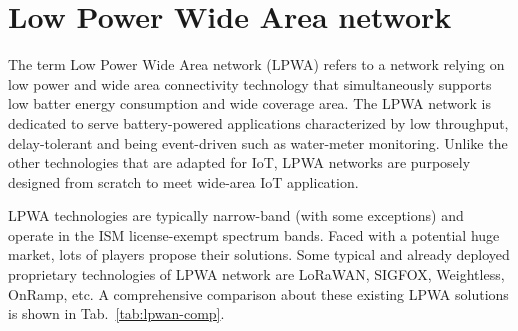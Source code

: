 \section{Low Power Wide Area network}
\label{sec:overview-lpwa}
The term Low Power Wide Area network (LPWA) refers to a network relying on low power and wide area connectivity technology that simultaneously supports low batter energy consumption and wide coverage area. The LPWA network is dedicated to serve battery-powered applications characterized by low throughput, delay-tolerant and being event-driven such as water-meter monitoring. Unlike the other technologies that are adapted for IoT, LPWA networks are purposely designed from scratch to meet wide-area IoT application. 

LPWA technologies are typically narrow-band (with some exceptions) and operate in the ISM license-exempt spectrum bands. Faced with a potential huge market, lots of players propose their solutions. Some typical and already deployed proprietary technologies of LPWA network are LoRaWAN, SIGFOX, Weightless, OnRamp, etc. A comprehensive comparison about these existing LPWA solutions is shown in Tab.~\ref{tab:lpwan-comp}.
